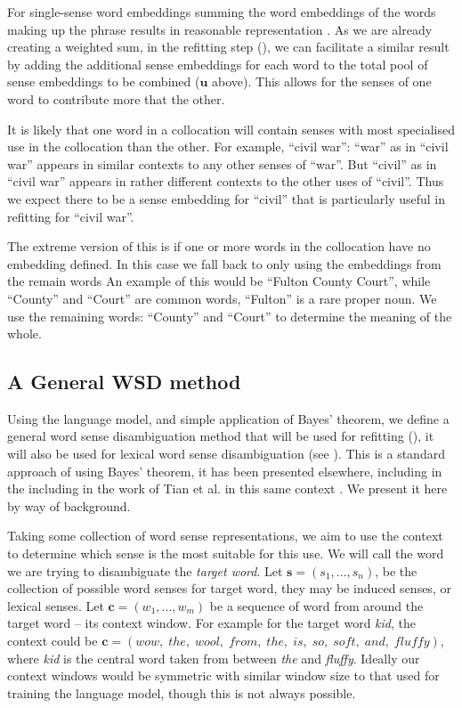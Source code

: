 \documentclass{sig-alternate}
\renewcommand{\c}{\mathbf{c}}
\newcommand{\s}{\mathbf{s}}
\renewcommand{\u}{\mathbf{u}}
\begin{document}
For single-sense word embeddings  summing the word embeddings of the words making up the phrase results in reasonable representation \parencite{mikolovSkip, White2015SentVecMeaning}.
As we are already creating a weighted sum, in the refitting step (), we can facilitate a similar result by adding the additional sense embeddings for each word to the total pool of sense embeddings to be combined ($\u$ above). This allows for the senses of one word to contribute more that the other.

It is likely that one word in a collocation will contain senses with most specialised use in the collocation than the other.
For example, \enquote{civil war}: \enquote{war} as in \enquote{civil war} appears in similar contexts to any other senses of \enquote{war}.
But \enquote{civil} as in \enquote{civil war} appears in rather different contexts to the other uses of \enquote{civil}. Thus we expect there to be a sense embedding for \enquote{civil} that is particularly useful in refitting for \enquote{civil war}.


The extreme version of this is if one or more words in the collocation have no embedding defined. In this case we fall back to only using the embeddings from the remain words An example of this would be ``Fulton County Court'', while ``County'' and ``Court'' are common words, ``Fulton'' is a rare proper noun. We use the remaining words: ``County'' and ``Court'' to determine the meaning of the whole.



\subsection{A General WSD method} \label{generalwsd}
Using the language model, and simple application of Bayes' theorem, we define a general word sense disambiguation method that will be used for refitting (), it will also be used for lexical word sense disambiguation (see ). This is a standard approach of using Bayes' theorem, it has been presented elsewhere, including in the including in the work of Tian et al. in this same context \parencite{tian2014probabilistic, AdaGrams}. We present it here by way of background.

Taking some collection of word sense representations, we aim to use the context to determine which sense is the most suitable for this use.
We will call the word we are trying to disambiguate the \emph{target word}.
Let $\s=(s_{1},...,s_{n})$, be the collection of possible word senses for target word, they may be induced senses, or lexical senses.
Let $\c=(w_{1},...,w_{m})$ be a sequence of word from around the target word -- its context window.
For example for the target word \emph{kid}, the context could be {$\c=(wow,\; the,\; wool,\; from,\; the,\; is,\; so,\; soft,\; and,\; fluffy)$}, where \emph{kid} is the central word taken from between \emph{the} and \emph{fluffy}.
Ideally our context windows would be symmetric with similar window size to that used for training the language model, though this is not always possible.
\end{document}
